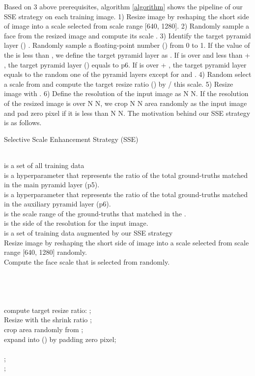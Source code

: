 \documentclass[10pt,twocolumn,letterpaper]{article}
\begin{document}
Based on 3 above prerequisites, algorithm \ref{algorithm} shows the pipeline of our SSE strategy on each training image. 1) Resize image by reshaping  the  short  side  of  image into a scale selected from scale range [640, 1280].  2) Randomly sample a face from the resized image and compute its scale . 3) Identify the target pyramid layer () . Randomly sample a floating-point number ()  from 0 to 1. If the value of the  is less than , we define the target pyramid layer  as . If  is over  and less than  + ,  the target pyramid layer () equals to p6. If   is over   + ,  the target pyramid layer equals to
the random one of the pyramid layers except for  and . 4) Random select a scale from  and compute the target resize ratio () by  / this scale. 
5) Resize image with . 6) Define the resolution of the input image as N  N. If the resolution of the resized image is over N  N, we crop N  N area randomly as the input image and pad zero pixel if it is less than N  N.
The motivation behind our SSE strategy is as follows.
\begin{algorithm}[t!]
\small
\caption{Selective Scale Enhancement Strategy (SSE)} 
\label{algorithm}
\begin{algorithmic}[1]
\REQUIRE ~~\\
 is a set of all training data \\
 is a hyperparameter that represents the ratio of the total ground-truths matched in the main pyramid layer (p5). \\
 is a hyperparameter that represents the ratio of the total ground-truths matched in the auxiliary pyramid layer (p6). \\
 is the scale range of the ground-truths that matched in the . \\
 is the side of the resolution for the input image.
\ENSURE ~~\\
 is a set of training data augmented by our SSE strategy \\
\vspace{2mm}
\STATE  Resize image by reshaping the short side of image into a scale selected from scale range [640, 1280] randomly.\\
\STATE Compute the face scale that is selected from   randomly. \\
\STATE  \\
\IF{ }
\STATE  \\
\ELSIF{} 
\STATE  \\
\ELSE
\STATE  \\
\ENDIF
\STATE compute target resize ratio: ;\\
\STATE   Resize  with the shrink ratio ; \\
\IF{ }
\STATE  crop  area randomly from ;  \\
\ELSE
\STATE  expand  into () by padding zero pixel;   \\
\ENDIF
{}
\STATE  \\
\ENDIF
\STATE ; \\
\ENDFOR
\RETURN ;
\end{algorithmic}
\end{algorithm}
\end{document}
